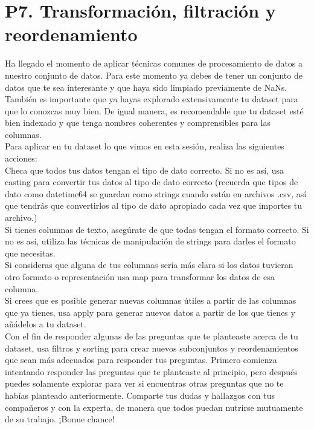 \documentclass{article}
\begin{document}
\section{P7. Transformación, filtración y reordenamiento}
Ha llegado el momento de aplicar técnicas comunes de procesamiento de datos a nuestro conjunto de datos. Para este momento ya debes de tener un conjunto de datos que te sea interesante y que haya sido limpiado previamente de NaNs. También es importante que ya hayas explorado extensivamente tu dataset para que lo conozcas muy bien. De igual manera, es recomendable que tu dataset esté bien indexado y que tenga nombres coherentes y comprensibles para las columnas.\\
Para aplicar en tu dataset lo que vimos en esta sesión, realiza las siguientes acciones:\\
Checa que todos tus datos tengan el tipo de dato correcto. Si no es así, usa casting para convertir tus datos al tipo de dato correcto (recuerda que tipos de dato como datetime64 se guardan como strings cuando están en archivos .csv, así que tendrás que convertirlos al tipo de dato apropiado cada vez que importes tu archivo.)\\
Si tienes columnas de texto, asegúrate de que todas tengan el formato correcto. Si no es así, utiliza las técnicas de manipulación de strings para darles el formato que necesitas.\\
Si consideras que alguna de tus columnas sería más clara si los datos tuvieran otro formato o representación usa map para transformar los datos de esa columna.\\
Si crees que es posible generar nuevas columnas útiles a partir de las columnas que ya tienes, usa apply para generar nuevos datos a partir de los que tienes y añádelos a tu dataset.\\
Con el fin de responder algunas de las preguntas que te planteaste acerca de tu dataset, usa filtros y sorting para crear nuevos subconjuntos y reordenamientos que sean más adecuados para responder tus preguntas. Primero comienza intentando responder las preguntas que te planteaste al principio, pero después puedes solamente explorar para ver si encuentras otras preguntas que no te habías planteado anteriormente.
Comparte tus dudas y hallazgos con tus compañeros y con la experta, de manera que todos puedan nutrirse mutuamente de su trabajo.
¡Bonne chance!
\end{document}
